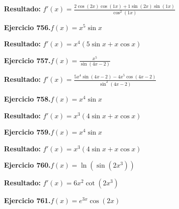 \documentclass[10pt,a4paper]{article}
\begin{document}
\begin{solbox}
\textbf{Resultado:} \(\displaystyle f'(x) = \frac{2\cos(2x)\cos(1x) + 1\sin(2x)\sin(1x)}{\cos^2(1x)}\)
\end{solbox}

\begin{ejbox}
\textbf{Ejercicio 756.}\quad $f(x) = x^{5} \sin x$
\end{ejbox}

\begin{solbox}
\textbf{Resultado:} \(\displaystyle f'(x) = x^{4}(5\sin x + x\cos x)\)
\end{solbox}

\newpage
\begin{ejbox}
\textbf{Ejercicio 757.}\quad $f(x) = \frac{x^{5}}{\sin(4x -2)}$
\end{ejbox}

\begin{solbox}
\textbf{Resultado:} \(\displaystyle f'(x) = \frac{5x^{4}\sin(4x -2) - 4x^{5}\cos(4x -2)}{\sin^2(4x -2)}\)
\end{solbox}

\begin{ejbox}
\textbf{Ejercicio 758.}\quad $f(x) = x^{4} \sin x$
\end{ejbox}

\begin{solbox}
\textbf{Resultado:} \(\displaystyle f'(x) = x^{3}(4\sin x + x\cos x)\)
\end{solbox}

\begin{ejbox}
\textbf{Ejercicio 759.}\quad $f(x) = x^{4} \sin x$
\end{ejbox}

\begin{solbox}
\textbf{Resultado:} \(\displaystyle f'(x) = x^{3}(4\sin x + x\cos x)\)
\end{solbox}

\newpage
\begin{ejbox}
\textbf{Ejercicio 760.}\quad $f(x) = \ln(\sin(2x^{3}))$
\end{ejbox}

\begin{solbox}
\textbf{Resultado:} \(\displaystyle f'(x) = 6x^{2}\cot(2x^{3})\)
\end{solbox}

\begin{ejbox}
\textbf{Ejercicio 761.}\quad $f(x) = e^{3x} \cos(2x)$
\end{ejbox}
\end{document}
